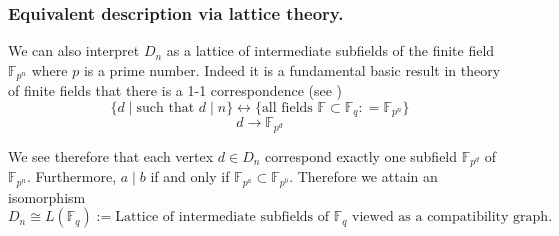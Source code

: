\documentclass[11pt,a4paper]{amsart}
\theoremstyle{definition}
\numberwithin{equation}{section}
\begin{document}
\subsubsection{Equivalent description via lattice theory.}
We can also interpret $D_n$ as a lattice of intermediate subfields of the finite field $\mathbb{F}_{p^n}$ where $p$ is a prime number. Indeed it is a fundamental basic result in theory of finite fields that there is a 1-1 correspondence (see \cite[Theorem 2.6]{lidl1997finite}) 
$$ \{ d \mid \text{such that } d \mid n \} \longleftrightarrow \{\text{all fields } \mathbb{F} \subset \mathbb{F}_{q}: = \mathbb{F}_{p^n} \} $$
$$ d \longrightarrow \mathbb{F}_{p^d} $$

We see therefore that each vertex $d \in D_n$ correspond exactly one subfield $\mathbb{F}_{p^d}$ of $\mathbb{F}_{p^n}$. Furthermore, $a \mid b$ if and only if $\mathbb{F}_{p^a} \subset \mathbb{F}_{p^b}$. Therefore we attain an isomorphism
$$ D_n \cong L(\mathbb{F}_q) := \text{Lattice of intermediate subfields of } \mathbb{F}_q \text{ viewed as a compatibility graph}.$$
\end{document}
